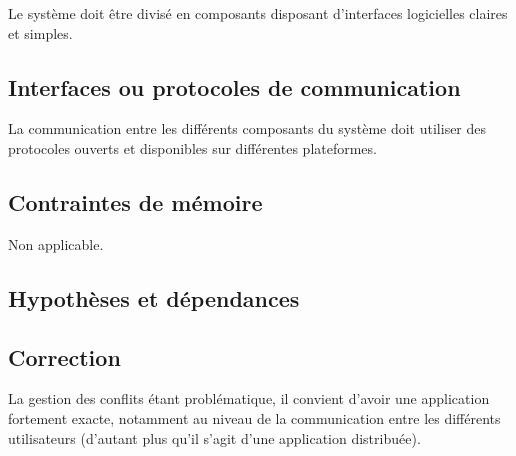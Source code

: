 \begin{requirement}
	Le système doit être divisé en composants disposant d’interfaces logicielles claires et simples.
\end{requirement}

	\subsection{Interfaces ou protocoles de communication}
	
\begin{requirement}
	La communication entre les différents composants du système doit utiliser des protocoles ouverts et disponibles sur différentes plateformes.
\end{requirement}

	\subsection{Contraintes de mémoire}
Non applicable.

\subsection{Hypothèses et dépendances}


\subsection{Correction}
 La gestion des conflits étant problématique, il convient d'avoir une application fortement exacte, notamment au niveau de la communication entre les différents utilisateurs (d'autant plus qu'il s'agit d'une application distribuée). 


